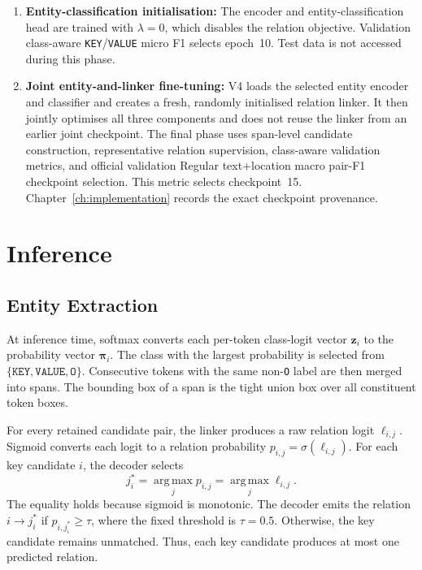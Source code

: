 \begin{enumerate}
  \item \textbf{Entity-classification initialisation:}
  The encoder and entity-classification head are trained with $\lambda=0$,
  which disables the relation objective. Validation class-aware
  \texttt{KEY}/\texttt{VALUE} micro F1 selects epoch~10. Test data is not
  accessed during this phase.

  \item \textbf{Joint entity-and-linker fine-tuning:}
  V4 loads the selected entity encoder and classifier and creates a fresh,
  randomly initialised relation linker. It then jointly optimises all three
  components and does not reuse the linker from an earlier joint checkpoint.
  The final phase uses span-level candidate construction, representative
  relation supervision, class-aware validation metrics, and official validation
  Regular text+location macro pair-F1 checkpoint selection. This metric selects
  checkpoint~15. Chapter~\ref{ch:implementation} records the exact checkpoint
  provenance.
\end{enumerate}

\section{Inference}
\label{sec:inference}

\subsection{Entity Extraction}
\label{sec:greedy-decoding}

At inference time, softmax converts each per-token class-logit vector
$\mathbf{z}_i$ to the probability vector $\boldsymbol{\pi}_i$. The class with
the largest probability is selected from
$\{\texttt{KEY},\texttt{VALUE},\texttt{O}\}$. Consecutive tokens with the
same non-\texttt{O} label are then merged into spans. The bounding box of a
span is the tight union box over all constituent token boxes.

For every retained candidate pair, the linker produces a raw relation logit
$\ell_{i,j}$. Sigmoid converts each logit to a relation probability
$p_{i,j}=\sigma(\ell_{i,j})$. For each key candidate $i$, the decoder selects
\[
  j_i^\ast
  =\operatorname*{arg\,max}_{j}p_{i,j}
  =\operatorname*{arg\,max}_{j}\ell_{i,j}.
\]
The equality holds because sigmoid is monotonic. The decoder emits the relation
$i\rightarrow j_i^\ast$ if $p_{i,j_i^\ast}\geq\tau$, where the fixed
threshold is $\tau=0.5$. Otherwise, the key candidate remains unmatched. Thus,
each key candidate produces at most one predicted relation.

